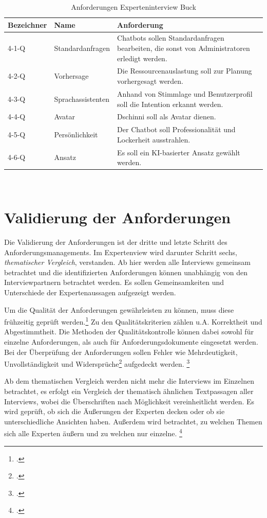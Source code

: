 \begin{table}[H]
\centering
\begin{tabularx}{1\textwidth}{l|l|X}
  Bezeichner & Name & Anforderung \\\hline
  4-1-Q & Standardanfragen & Chatbots sollen Standardanfragen bearbeiten, die sonst von Administratoren erledigt werden. \\
  4-2-Q & Vorhersage & Die Ressourcenauslastung soll zur Planung vorhergesagt werden. \\
  4-3-Q & Sprachassistenten & Anhand von Stimmlage und Benutzerprofil soll die Intention erkannt werden. \\
  4-4-Q & Avatar & Dschinni soll als Avatar dienen. \\
  4-5-Q & Persönlichkeit & Der Chatbot soll Professionalität und Lockerheit ausstrahlen. \\
  4-6-Q & Ansatz & Es soll ein KI-basierter Ansatz gewählt werden. \\
\end{tabularx}
\\\eigen
\caption{Anforderungen Experteninterview Buck}
\label{tab:expbuck}
\end{table}


\section{Validierung der Anforderungen} \label{Validierung}
Die Validierung der Anforderungen ist der dritte und letzte Schritt des Anforderungsmanagements. Im Expertenview wird darunter Schritt sechs, \textit{thematischer Vergleich}, verstanden. Ab hier werden alle Interviews gemeinsam betrachtet und die identifizierten Anforderungen können unabhängig von den Interviewpartnern betrachtet werden. Es sollen Gemeinsamkeiten und Unterschiede der Expertenaussagen aufgezeigt werden.

Um die Qualität der Anforderungen gewährleisten zu können, muss diese frühzeitig geprüft werden.\footcite[Vgl.][4]{Pohl_2015_Requirements}
Zu den Qualitätskriterien zählen u.A. Korrektheit und Abgestimmtheit. Die Methoden der Qualitätskontrolle können dabei sowohl für einzelne Anforderungen, als auch für Anforderungsdokumente eingesetzt werden.
Bei der Überprüfung der Anforderungen sollen Fehler wie \glqq{}Mehrdeutigkeit, Unvollständigkeit und Widersprüche\grqq\footcite[][95]{Pohl_2015_Requirements} aufgedeckt werden.
\footcite[Vgl.][95]{Pohl_2015_Requirements}

Ab dem thematischen Vergleich werden nicht mehr die Interviews im Einzelnen betrachtet, es erfolgt ein Vergleich der thematisch ähnlichen Textpassagen aller Interviews, wobei die Überschriften nach Möglichkeit vereinheitlicht werden. Es wird geprüft, ob sich die Äußerungen der Experten decken oder ob sie unterschiedliche Ansichten haben. Außerdem wird betrachtet, zu welchen Themen sich alle Experten äußern und zu welchen nur einzelne.
\footcites[Vgl.][459\psq]{Meuser_1991_Interview}[Vgl.][37]{Matthes_1986}


